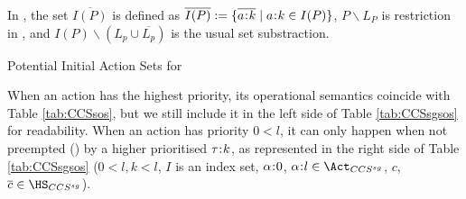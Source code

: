 \documentclass[adraft,hidelinks]{eptcs}
\begin{document}
In , the set $\overline{I(P)}$ is defined as $\overline{I(P)} := \{\overline{a\hspace{-0.8mm}:\hspace{-0.8mm} k} \mid a\hspace{-0.8mm}:\hspace{-0.8mm} k \in I(P)\}$,
$P\backslash L_P$ is restriction in \CSG, and $I(P)\backslash(L_p\cup\overline{L_p})$ is the usual set substraction.

\begin{table}[t]
\normalsize
\centering
\caption{Potential Initial Action Sets for \CSG}
\label{tab:pias}
\end{table}

When an action has the highest priority, its operational semantics coincide with Table \ref{tab:CCSsos}, but we still include it in the left side of Table \ref{tab:CCSsgsos} for readability.
When an action has priority $0 < l$, it can only happen when not preempted () by a higher prioritised $\tau\hspace{-0.8mm}:\hspace{-0.8mm} k$, as represented in the right side of Table \ref{tab:CCSsgsos} ($0<l, k<l$, $I$ is an index set, $\alpha\hspace{-0.8mm}:\hspace{-0.8mm} 0$, $\alpha\cln l\in\Act_{CCS^{sg}}$, $c$, $\overline{c}\in \HS_{CCS^{sg}}$).
\end{document}
